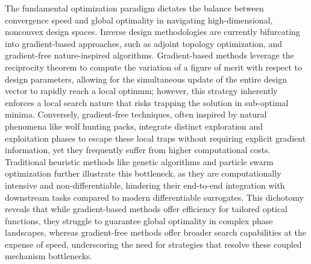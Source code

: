 \documentclass[11pt]{article}
\begin{document}
The fundamental optimization paradigm dictates the balance between convergence speed and global optimality in navigating high-dimensional, nonconvex design spaces. Inverse design methodologies are currently bifurcating into gradient-based approaches, such as adjoint topology optimization, and gradient-free nature-inspired algorithms. Gradient-based methods leverage the reciprocity theorem to compute the variation of a figure of merit with respect to design parameters, allowing for the simultaneous update of the entire design vector to rapidly reach a local optimum; however, this strategy inherently enforces a local search nature that risks trapping the solution in sub-optimal minima. Conversely, gradient-free techniques, often inspired by natural phenomena like wolf hunting packs, integrate distinct exploration and exploitation phases to escape these local traps without requiring explicit gradient information, yet they frequently suffer from higher computational costs. Traditional heuristic methods like genetic algorithms and particle swarm optimization further illustrate this bottleneck, as they are computationally intensive and non-differentiable, hindering their end-to-end integration with downstream tasks compared to modern differentiable surrogates. This dichotomy reveals that while gradient-based methods offer efficiency for tailored optical functions, they struggle to guarantee global optimality in complex phase landscapes, whereas gradient-free methods offer broader search capabilities at the expense of speed, underscoring the need for strategies that resolve these coupled mechanism bottlenecks. \citep{s2_2516273dc5b4511c838bf9236a61f71f4e32f6b5_1724698f} \citep{doi_10_1088_1367_2630_acfcd6_32444f17} \citep{s2_76a83ea3baed75ad88b7f0782eb9a694a330c853_cee16cac}
\end{document}
